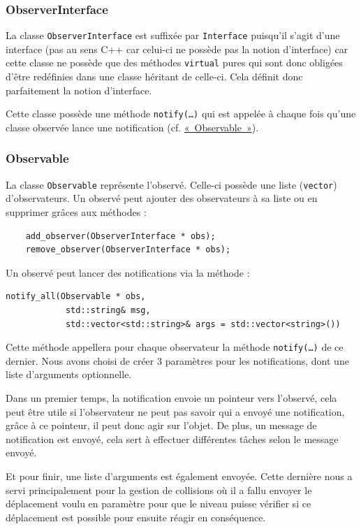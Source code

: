 \documentclass[]{report}
\begin{document}
\subsubsection{ObserverInterface}

La classe \texttt{ObserverInterface} est suffixée par \texttt{Interface} puisqu'il
s'agit d'une interface (pas au sens C++ car celui-ci ne possède pas la notion
d'interface) car cette classe ne possède que des méthodes \texttt{virtual} pures
qui sont donc obligées d'être redéfinies dans une classe héritant de celle-ci.
Cela définit donc parfaitement la notion d'interface.

Cette classe possède une méthode \texttt{notify(\dots)} qui est appelée à chaque fois
qu'une classe observée lance une notification (cf. \hyperref[Observable]{«~Observable~»}).

\subsubsection{\label{Observable}Observable}

La classe \texttt{Observable} représente l'observé. Celle-ci possède
une liste (\texttt{vector}) d'observateurs.
Un observé peut ajouter des observateurs à sa liste ou en supprimer grâces aux méthodes :
\begin{lstlisting}
    add_observer(ObserverInterface * obs);
    remove_observer(ObserverInterface * obs);
\end{lstlisting}

Un observé peut lancer des notifications via la méthode :
\begin{lstlisting}
notify_all(Observable * obs, 
            std::string& msg, 
            std::vector<std::string>& args = std::vector<string>())
\end{lstlisting}

Cette méthode appellera pour chaque observateur la méthode \texttt{notify(\dots)} de ce dernier.
Nous avons choisi de créer 3 paramètres pour les notifications, dont une liste d'arguments optionnelle.

Dans un premier temps, la notification envoie un pointeur vers l'observé, cela peut être utile si l'observateur
ne peut pas savoir qui a envoyé une notification, grâce à ce pointeur, il peut donc agir sur l'objet. De plus, un message
de notification est envoyé, cela sert à effectuer différentes tâches selon le message envoyé.

Et pour finir, une liste d'arguments est également envoyée. Cette dernière nous a servi principalement pour la gestion
de collisions où il a fallu envoyer le déplacement voulu en paramètre pour que le niveau puisse vérifier si ce déplacement est
possible pour ensuite réagir en conséquence.
\end{document}
